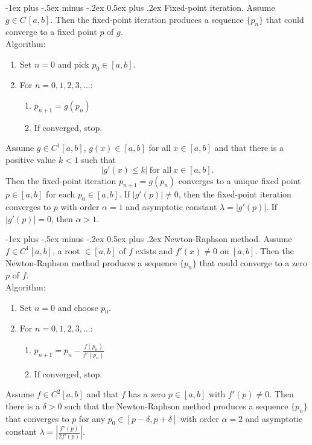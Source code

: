 \documentclass[10pt,landscape,a4paper]{article}
\makeatletter
\renewcommand{\section}{\@startsection{section}{1}{0mm}%
	{-1ex plus -.5ex minus -.2ex}%
	{0.5ex plus .2ex}%
	{\normalfont\large\bfseries}}
\makeatother
\begin{document}
\begin{multicols}{3}
	\section{Fixed-point iteration.}
	Assume $ g\in C\,[a,b] $.
	Then the fixed-point iteration produces a sequence $ \{p_n\} $ that could converge to a fixed point $ p $ of $ g $.\\
	Algorithm:
	\begin{enumerate}
		\item Set $ n=0 $ and pick $ p_0\in[a,b] $.
		\item For $ n=0,1,2,3,\hdots $:
		      \begin{enumerate}
			      \item $ p_{n+1}=g(p_n) $
			      \item If converged, stop.
		      \end{enumerate}
	\end{enumerate}
	Assume $ g\in C^1[a,b] $, $ g(x)\in[a,b] $ for all $ x\in[a,b] $ and that there is a positive value $ k<1 $ such that
	\[
		|g'(x)\leq k| \ \text{for all} \ x\in[a,b].
	\]
	Then the fixed-point iteration $ p_{n+1}=g(p_n) $ converges to a unique fixed point $ p\in[a,b] $ for each $ p_0\in[a,b] $.
	If $ |g'(p)|\neq0 $, then the fixed-point iteration converges to $ p $ with order $ \alpha=1 $ and asymptotic constant $ \lambda=|g'(p)| $. If $ |g'(p)|=0 $, then $ \alpha>1 $.
	
	\section{Newton-Raphson method.}
	Assume $ f\in C^1[a,b] $, a root $ \in[a,b] $ of $ f $ exists and $ f'(x)\neq0 $ on $ [a,b] $.
	Then the Newton-Raphson method produces a sequence $ \{p_n\} $ that could converge to a zero $ p $ of $ f $.\\
	Algorithm:
	\begin{enumerate}
		\item Set $ n=0 $ and choose $ p_0 $.
		\item For $ n=0,1,2,3,\hdots $:
		      \begin{enumerate}
			      \item $ p_{n+1}=p_n-\frac{f(p_n)}{f'(p_n)} $
			      \item If converged, stop.
		      \end{enumerate}
	\end{enumerate}
	Assume $ f\in C^2[a,b] $ and that $ f $ has a zero $ p\in[a,b] $ with $ f'(p)\neq0 $.
	Then there is a $ \delta>0 $ such that the Newton-Raphson method produces a sequence $ \{p_n\} $ that converges to $ p $ for any $ p_0\in[p-\delta,p+\delta] $ with order $ \alpha=2 $ and asymptotic constant $ \lambda=\left|\frac{f''(p)}{2f'(p)}\right| $.
	

\end{multicols}
\end{document}
